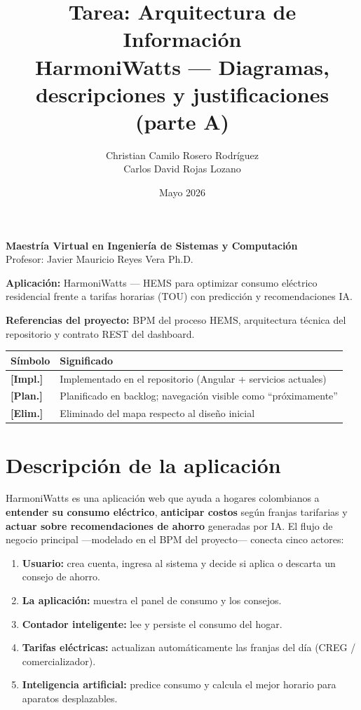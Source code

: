 \documentclass[11pt,a4paper]{article}
\title{\textbf{Tarea: Arquitectura de Información}\\
\large HarmoniWatts --- Diagramas, descripciones y justificaciones (parte A)}
\author{Christian Camilo Rosero Rodríguez \\ Carlos David Rojas Lozano}
\date{Mayo 2026}
\newcommand{\stimpl}{\textcolor{impl}{\textbf{[Impl.]}}}
\newcommand{\stplan}{\textcolor{plan}{\textbf{[Plan.]}}}
\newcommand{\stelim}{\textbf{[Elim.]}}
\begin{document}
\maketitle

\begin{center}
\small
\textbf{Maestría Virtual en Ingeniería de Sistemas y Computación}\\
Profesor: Javier Mauricio Reyes Vera Ph.D.
\end{center}

\vspace{0.5em}
\noindent\textbf{Aplicación:} HarmoniWatts --- HEMS para optimizar consumo eléctrico residencial frente a tarifas horarias (TOU) con predicción y recomendaciones IA.

\vspace{0.8em}
\noindent\textbf{Referencias del proyecto:} BPM del proceso HEMS, arquitectura técnica del repositorio y contrato REST del dashboard.

\vspace{0.5em}
\begin{tabular}{@{}L{2.2cm}L{12cm}@{}}
\toprule
\textbf{Símbolo} & \textbf{Significado} \\
\midrule
\stimpl & Implementado en el repositorio (Angular + servicios actuales) \\
\stplan & Planificado en backlog; navegación visible como ``próximamente'' \\
\stelim & Eliminado del mapa respecto al diseño inicial \\
\bottomrule
\end{tabular}

\section{Descripción de la aplicación}

HarmoniWatts es una aplicación web que ayuda a hogares colombianos a \textbf{entender su consumo eléctrico}, \textbf{anticipar costos} según franjas tarifarias y \textbf{actuar sobre recomendaciones de ahorro} generadas por IA. El flujo de negocio principal ---modelado en el BPM del proyecto--- conecta cinco actores:

\begin{enumerate}[leftmargin=*]
  \item \textbf{Usuario:} crea cuenta, ingresa al sistema y decide si aplica o descarta un consejo de ahorro.
  \item \textbf{La aplicación:} muestra el panel de consumo y los consejos.
  \item \textbf{Contador inteligente:} lee y persiste el consumo del hogar.
  \item \textbf{Tarifas eléctricas:} actualizan automáticamente las franjas del día (CREG / comercializador).
  \item \textbf{Inteligencia artificial:} predice consumo y calcula el mejor horario para aparatos desplazables.
\end{enumerate}
\end{document}
